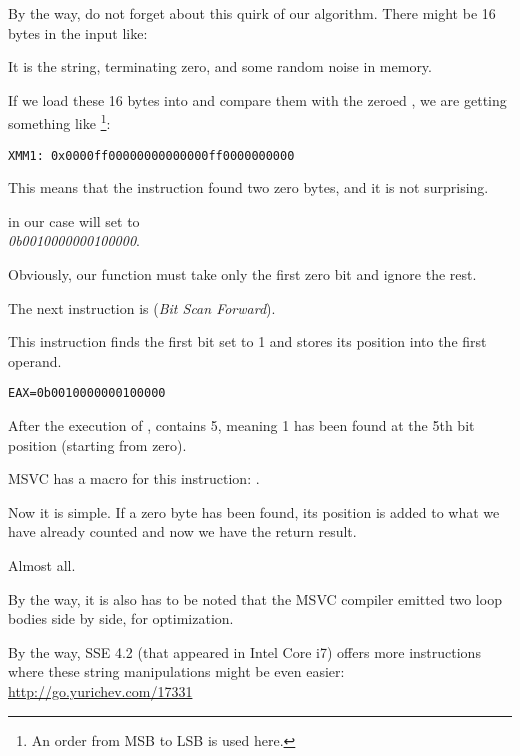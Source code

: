 By the way, do not forget about this quirk of our algorithm.
There might be 16 bytes in the input like:



It is the  string, terminating zero, and some random noise in memory.

If we load these 16 bytes into  and compare them with the zeroed , 
we are getting something like
\footnote{An order from \ac{MSB} to \ac{LSB} is used here.}:

\begin{verbatim}
XMM1: 0x0000ff00000000000000ff0000000000
\end{verbatim}

This means that the instruction found two zero bytes, and it is not surprising.
 
 in our case will set \EAX to\\
\emph{0b0010000000100000}.

Obviously, our function must take only the first zero bit and ignore the rest.

\label{instruction_BSF}
The next instruction is  (\emph{Bit Scan Forward}). 

This instruction finds the first bit set to 1 and stores its position into the first operand.

\begin{verbatim}
EAX=0b0010000000100000
\end{verbatim}

After the execution of , \EAX contains 5, meaning 
1 has been found at the 5th bit position (starting from zero).

MSVC has a macro for this instruction: .

Now it is simple. If a zero byte has been found, its position is added to what we have already counted and now we have 
the return result.

Almost all.

By the way, it is also has to be noted that the MSVC compiler emitted two loop bodies side by side, for optimization.

By the way, SSE 4.2 (that appeared in Intel Core i7) offers more instructions where these string manipulations might be
even easier: \url{http://go.yurichev.com/17331}

